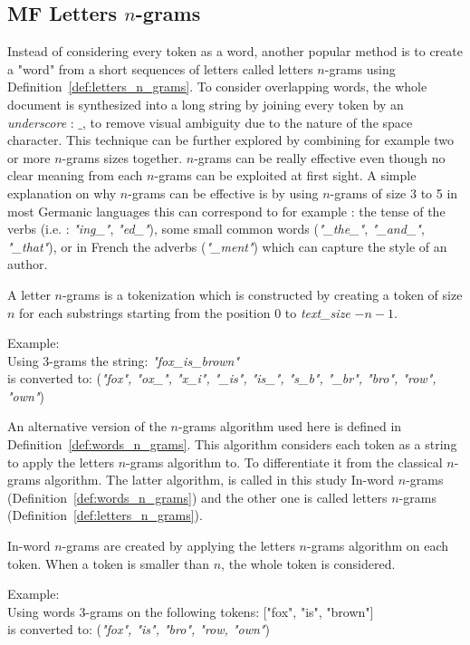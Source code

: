 \subsection{MF Letters $n$-grams}

Instead of considering every token as a word, another popular method is to create a "word" from a short sequences of letters called letters $n$-grams using Definition~\ref{def:letters_n_grams}.
To consider overlapping words, the whole document is synthesized into a long string by joining every token by an \textit{underscore} : $\_$, to remove visual ambiguity due to the nature of the space character.
This technique can be further explored by combining for example two or more $n$-grams sizes together.
$n$-grams can be really effective even though no clear meaning from each $n$-grams can be exploited at first sight.
A simple explanation on why $n$-grams can be effective is by using $n$-grams of size 3 to 5 in most Germanic languages this can correspond to for example : the tense of the verbs (i.e. : \textit{"ing\_"}, \textit{"ed\_"}), some small common words (\textit{"\_the\_"}, \textit{"\_and\_"}, \textit{"\_that"}), or in French the adverbs (\textit{"\_ment"}) which can capture the style of an author.

\begin{definition}
  \label{def:letters_n_grams}
  A letter $n$-grams is a tokenization which is constructed by creating a token of size $n$ for each substrings starting from the position $0$ to \textit{text\_size} $- n - 1$.

  Example: \\
  Using 3-grams the string: \textit{"fox\_is\_brown"} \\
  is converted to: (\textit{"fox", "ox\_", "x\_i", "\_is", "is\_", "s\_b", "\_br", "bro", "row", "own"})
\end{definition}

An alternative version of the $n$-grams algorithm used here is defined in Definition~\ref{def:words_n_grams}.
This algorithm considers each token as a string to apply the letters $n$-grams algorithm to.
To differentiate it from the classical $n$-grams algorithm.
The latter algorithm, is called in this study In-word $n$-grams (Definition~\ref{def:words_n_grams}) and the other one is called letters $n$-grams (Definition~\ref{def:letters_n_grams}).

\begin{definition}
  \label{def:words_n_grams}
  In-word $n$-grams are created by applying the letters $n$-grams algorithm on each token.
  When a token is smaller than $n$, the whole token is considered.

  Example: \\
  Using words 3-grams on the following tokens: ["fox", "is", "brown"] \\
  is converted to: (\textit{"fox", "is", "bro", "row, "own"})
\end{definition}
